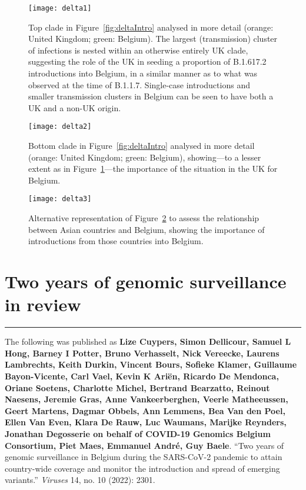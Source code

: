 \begin{figure}[ht]
  \centering
  \texttt{[image: delta1]}
  \caption[B.1.617.2 clade 1]{Top clade in Figure~\ref{fig:deltaIntro} analysed in more detail (orange: United Kingdom; green: Belgium). The largest (transmission) cluster of infections is nested within an otherwise entirely UK clade, suggesting the role of the UK in seeding a proportion of B.1.617.2 introductions into Belgium, in a similar manner as to what was observed at the time of B.1.1.7. Single-case introductions and smaller transmission clusters in Belgium can be seen to have both a UK and a non-UK origin.}
  \label{fig:delta1}
\end{figure}

\begin{figure}[ht]
  \centering
  \texttt{[image: delta2]}
  \caption[B.1.617.2 clade 2]{Bottom clade in Figure~\ref{fig:deltaIntro} analysed in more detail (orange: United Kingdom; green: Belgium), showing---to a lesser extent as in Figure~\ref{fig:delta1}---the importance of the situation in the UK for Belgium.}
  \label{fig:delta2}
\end{figure}

\begin{figure}[ht]
  \centering
  \texttt{[image: delta3]}
  \caption[B.1.617.2 alternate coloring]{Alternative representation of Figure~\ref{fig:delta2} to assess the relationship between Asian countries and Belgium, showing the importance of introductions from those countries into Belgium.}
  \label{fig:delta3}
\end{figure}

\section{Two years of genomic surveillance in review}\label{sec:twoYears}

\singlespacing
\hrule
\vspace*{12pt}
The following was published as \textbf{Lize Cuypers, Simon Dellicour, Samuel L Hong, Barney I Potter, Bruno Verhasselt, Nick Vereecke, Laurens Lambrechts, Keith Durkin, Vincent Bours, Sofieke Klamer, Guillaume Bayon-Vicente, Carl Vael, Kevin K Ari\"{e}n, Ricardo De Mendonca, Oriane Soetens, Charlotte Michel, Bertrand Bearzatto, Reinout Naesens, Jeremie Gras, Anne Vankeerberghen, Veerle Matheeussen, Geert Martens, Dagmar Obbels, Ann Lemmens, Bea Van den Poel, Ellen Van Even, Klara De Rauw, Luc Waumans, Marijke Reynders, Jonathan Degosserie on behalf of COVID-19 Genomics Belgium Consortium, Piet Maes, Emmanuel Andr\'{e}, Guy Baele}.
``Two years of genomic surveillance in Belgium during the SARS-CoV-2 pandemic to attain country-wide coverage and monitor the introduction and spread of emerging variants.'' \textit{Viruses} 14, no.
10 (2022): 2301.

